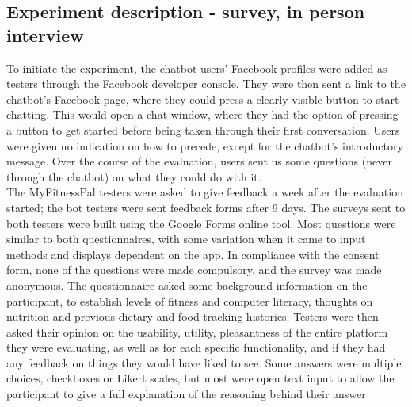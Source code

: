 \subsection{Experiment description - survey, in person interview}
To initiate the experiment, the chatbot users' Facebook profiles were added as testers through the Facebook developer console. They were then sent a link to the chatbot's Facebook page, where they could press a clearly visible button to start chatting. This would open a chat window, where they had the option of pressing a button to get started before being taken through their first conversation. Users were given no indication on how to precede, except for the chatbot's introductory message. Over the course of the evaluation, users sent us some questions (never through the chatbot) on what they could do with it. \\
The MyFitnessPal testers were asked to give feedback a week after the evaluation started; the bot testers were sent feedback forms after 9 days.
The surveys sent to both testers were built using the Google Forms online tool. Most questions were similar to both questionnaires, with some variation when it came to input methods and displays dependent on the app. In compliance with the consent form, none of the questions were made compulsory, and the survey was made anonymous.
The questionnaire asked some background information on the participant, to establish levels of fitness and computer literacy, thoughts on nutrition and previous dietary and food tracking histories.
Testers were then asked their opinion on the usability, utility, pleasantness of the entire platform they were evaluating, as well as for each specific functionality, and if they had any feedback on things they would have liked to see. Some answers were multiple choices, checkboxes or Likert scales, but most were open text input to allow the participant to give a full explanation of the reasoning behind their answer
